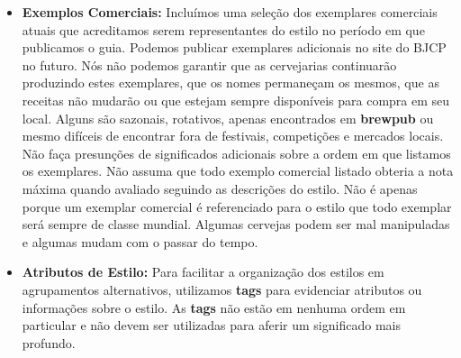 \begin{itemize}
\item \textbf{Exemplos Comerciais:} Incluímos uma seleção dos exemplares comerciais atuais que acreditamos serem representantes do estilo no período em que publicamos o guia. Podemos publicar exemplares adicionais no site do BJCP no futuro. Nós não podemos garantir que as cervejarias continuarão produzindo estes exemplares, que os nomes permaneçam os mesmos, que as receitas não mudarão ou que estejam sempre disponíveis para compra em seu local. Alguns são sazonais, rotativos, apenas encontrados em \textbf{brewpub} ou mesmo difíceis de encontrar fora de festivais, competições e mercados locais.
Não faça presunções de significados adicionais sobre a ordem em que listamos os exemplares. Não assuma que todo exemplo comercial listado obteria a nota máxima quando avaliado seguindo as descrições do estilo. Não é apenas porque um exemplar comercial é referenciado para o estilo que todo exemplar será sempre de classe mundial. Algumas cervejas podem ser mal manipuladas e algumas mudam com o passar do tempo.
\item \textbf{Atributos de Estilo:} Para facilitar a organização dos estilos em agrupamentos alternativos, utilizamos \textbf{tags} para evidenciar atributos ou informações sobre o estilo. As \textbf{tags} não estão em nenhuma ordem em particular e não devem ser utilizadas para aferir um significado mais profundo.
\end{itemize}
